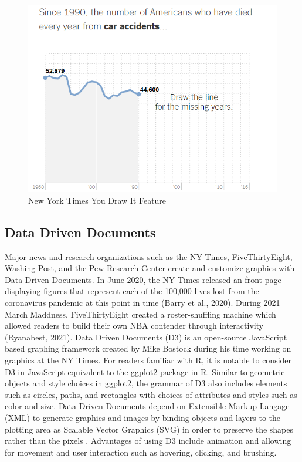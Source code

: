 \documentclass[print]{nuthesis}
\begin{document}
\begin{figure}[tbp]

{\centering \includegraphics[width=0.75\linewidth,]{images/nyt-caraccidents-frame1} 

}

\caption{New York Times You Draw It Feature}\label{fig:nyt-caraccidents}
\end{figure}

\hypertarget{data-driven-documents}{%
\subsection{Data Driven Documents}\label{data-driven-documents}}

Major news and research organizations such as the NY Times, FiveThirtyEight, Washing Post, and the Pew Research Center create and customize graphics with Data Driven Documents.
In June 2020, the NY Times released an front page displaying figures that represent each of the 100,000 lives lost from the coronavirus pandemic at this point in time (Barry et al., 2020).
During 2021 March Maddness, FiveThirtyEight created a roster-shuffling machine which allowed readers to build their own NBA contender through interactivity (Ryanabest, 2021).
Data Driven Documents (D3) is an open-source JavaScript based graphing framework created by Mike Bostock during his time working on graphics at the NY Times.
For readers familiar with R, it is notable to consider D3 in JavaScript equivalent to the ggplot2 package in R.
Similar to geometric objects and style choices in ggplot2, the grammar of D3 also includes elements such as circles, paths, and rectangles with choices of attributes and styles such as color and size.
Data Driven Documents depend on Extensible Markup Langage (XML) to generate graphics and images by binding objects and layers to the plotting area as Scalable Vector Graphics (SVG) in order to preserve the shapes rather than the pixels  .
Advantages of using D3 include animation and allowing for movement and user interaction such as hovering, clicking, and brushing.
\end{document}
